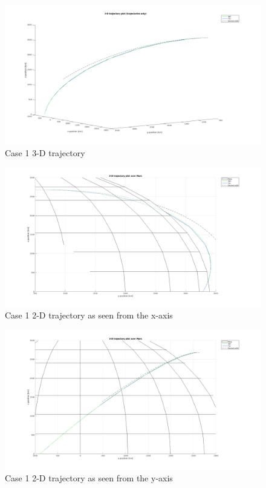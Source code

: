 \begin{figure}[!ht]
\centering
\includegraphics[width=0.8 \textwidth]{figures/verification/case1/PlotFigure2Zoom.png}
\caption{Case 1 3-D trajectory}
\label{fig:PlotFigure2Zoom}
\end{figure}

\begin{figure}[!ht]
\centering
\includegraphics[width=0.8 \textwidth]{figures/verification/case1/PlotFigure1SeenFromZoomXaxis.png}
\caption{Case 1 2-D trajectory as seen from the x-axis}
\label{fig:PlotFigure1SeenFromZoomXaxis}
\end{figure}

\begin{figure}[!ht]
\centering
\includegraphics[width=0.8 \textwidth]{figures/verification/case1/PlotFigure1SeenFromZoomYaxis.png}
\caption{Case 1 2-D trajectory as seen from the y-axis}
\label{fig:PlotFigure1SeenFromZoomYaxis}
\end{figure}

